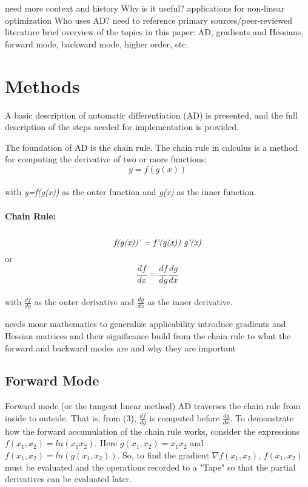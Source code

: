 \documentclass[oneside]{article}
\begin{document}
\begin{editnote}
need more context and history
Why is it useful?
applications for non-linear optimization
Who uses AD?
need to reference primary sources/peer-reviewed literature
brief overview of the topics in this paper:  AD, gradients and Hessians, forward mode, backward mode, higher order, etc.
\end{editnote}

\section{Methods}

A basic description of automatic differentiation (AD) is presented, and the full description of the steps needed for implementation is provided.

The foundation of AD is the chain rule. The chain rule in calculus is a method for computing the derivative of two or more functions:\\
 \begin{equation}
 y = f(g(x))
 \end{equation}
  \\
 with \textit{y=f(g(x))} as the outer function and \textit{g(x)} as the inner function. \\
 \\
 \textbf{Chain Rule:} \\ \\
  \begin{equation}
 \textit{f(g(x))' = f'(g(x)) g'(x)} \\
 \end{equation}
 or \\
\begin{equation}
\frac{df}{dx} = \frac{df}{dg}\frac{dg}{dx}
\end{equation}
\\
with \textit{$\frac{df}{dg}$} as the outer derivative and \textit{$\frac{dg}{dx}$} as the inner derivative. \\

\begin{editnote}
needs moar mathematics to generalize applicability
introduce gradients and Hessian matrices and their significance
build from the chain rule to what the forward and backward modes are and why they are important
\end{editnote}

\subsection{Forward Mode}
Forward mode (or the tangent linear method) AD traverses the chain rule from inside to outside. That is, from (3),  \textit{$\frac{df}{dg}$} is computed before \textit{$\frac{dg}{dx}$}. To demonstrate how the forward accumulation of the chain rule works, consider the expressions $f(x_1,x_2) = ln(x_1x_2)$. Here $g(x_1,x_2) = x_1x_2$ and $f(x_1,x_2) = ln(g(x_1,x_2))$. So, to find the gradient $\nabla f(x_1,x_2)$, $f(x_1,x_2)$ must be evaluated and the operations recorded to a "Tape" so that the partial derivatives can be evaluated later.\\
\end{document}
